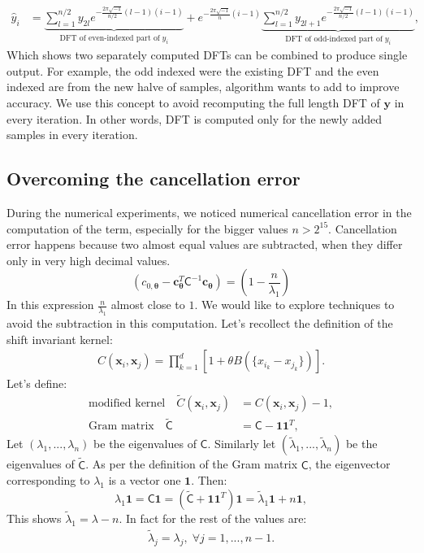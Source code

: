 \documentclass[smallextended]{svjour3}       %
\newcommand{\bm}[1]{\boldsymbol{#1}}
\newcommand{\vtheta}{{\bm{\theta}}}
\newcommand{\vc}{\bm{c}}
\newcommand{\vx}{\bm{x}}
\newcommand{\vy}{\bm{y}}
\newcommand{\vone}{\bm{1}}
\newcommand{\mC}{\mathsf{C}}
\newcommand{\mCInv}{{\mathsf{C}^{-1}}}
\newcommand{\tmC}{\widetilde{\mathsf{C}}}
\newcommand{\tlambda}{\tilde{\lambda}}
\begin{document}
\begin{align*}
\hat{y}_i &=  
\underbrace{
\sum_{l=1}^{n/2} y_{2l} 
e^{- \frac{2\pi \sqrt{-1}}{n/2} (l-1)( i-1) }
}_{\text{DFT of even-indexed part of}\; y_i}
+
e^{- \frac{2\pi \sqrt{-1}}{n} (i-1) }
\underbrace{
\sum_{l=1}^{n/2} y_{2l+1} 
e^{- \frac{2\pi \sqrt{-1}}{n/2} (l-1)( i-1) }
}_{\text{DFT of odd-indexed part of}\; y_i},
\end{align*}
Which shows two separately computed DFTs can be combined to produce single output. For example, the odd indexed were the existing DFT and the even indexed are from the new halve of samples, algorithm wants to add to improve accuracy.
We use this concept to avoid recomputing the full length DFT of $\vy$ in every iteration. In other words, DFT is computed only for the newly added samples in every iteration.















\subsection{Overcoming the cancellation error}
During the numerical experiments, we noticed numerical cancellation error in the computation of the term, especially for the bigger values $n > 2^{15}$. Cancellation error happens because two almost equal values are subtracted, when they differ only in very high decimal values. 
\[
\left(c_{0,\vtheta} - {\vc}_{\vtheta}^T\mCInv\vc_{\vtheta} \right) = 
\left(
1 - \frac{n }{\lambda_1} \right)
\]
In this expression $\frac{n}{\lambda_1}$ almost close to $1$.
We would like to explore techniques to avoid the subtraction in this computation.
Let's recollect the definition of the shift invariant kernel:
\begin{align*}
C(\vx_i, \vx_j) = \prod_{k=1}^d \left[1 + \theta B(\{x_{i_k} - x_{j_k}\}) \right].
\end{align*}
Let's define:
\begin{align*}
\text{modified kernel} \quad \widetilde{C}(\vx_i, \vx_j) &= C(\vx_i, \vx_j) - 1,
\\
\text{Gram matrix} \quad \tmC &= \mC - \vone \vone^T,
\end{align*}
Let $(\lambda_1, ..., \lambda_n)$ be the eigenvalues of $\mC$. Similarly let $(\tlambda_1, ..., \tlambda_n)$ be the eigenvalues of $\tmC$. As per the definition of the Gram matrix $\mC$, the eigenvector corresponding to $\lambda_1$ is a vector one $\vone$. 
Then:
\begin{equation}
\nonumber
\lambda_1 \vone  = \mC \vone 
 = (\tmC + \vone \vone^T) \vone
 = \tlambda_1 \vone + n \vone,
\end{equation}
This shows $\tlambda_1 = \lambda - n$. In fact for the rest of the values are:
\begin{align}
\label{eqn:lambda_to_tlambda_relation}
\tlambda_j = \lambda_j, \; \forall j=1,...,n-1.
\end{align}
\end{document}
